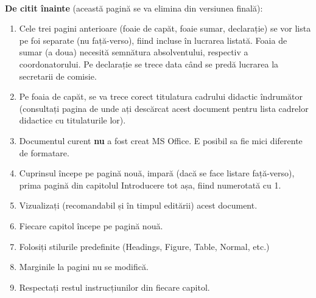 \thispagestyle{empty}
\begin{center}\large
	
\end{center}
~\\

{\color{red}\large{\bf De citit înainte} (această pagină se va elimina din versiunea finală)}:\\
\begin{enumerate}
 \item Cele trei pagini anterioare (foaie de capăt, foaie sumar, declarație) se vor lista pe foi separate (nu față-verso), fiind incluse în lucrarea listată. 
 Foaia de sumar (a doua) necesită semnătura absolventului, respectiv a coordonatorului.
 Pe declarație se trece data când se predă lucrarea la secretarii de comisie.\\
 \item Pe foaia de capăt, se va trece corect titulatura cadrului didactic îndrumător (consultați pagina de unde ați descărcat acest document pentru lista cadrelor didactice cu titulaturile lor).\\
 \item Documentul curent \textbf{nu} a fost creat MS Office. E posibil sa fie mici diferente de formatare.\\
 \item Cuprinsul începe pe pagină nouă, impară (dacă se face listare față-verso), prima pagină din capitolul Introducere tot așa, fiind numerotată cu 1.\\
 \item Vizualizați (recomandabil și în timpul editării) acest document.\\
 \item Fiecare capitol începe pe pagină nouă.\\
 \item Folosiți stilurile predefinite (Headings, Figure, Table, Normal, etc.)\\
 \item Marginile la pagini nu se modifică.\\
 \item Respectați restul instrucțiunilor din fiecare capitol.
\end{enumerate}
